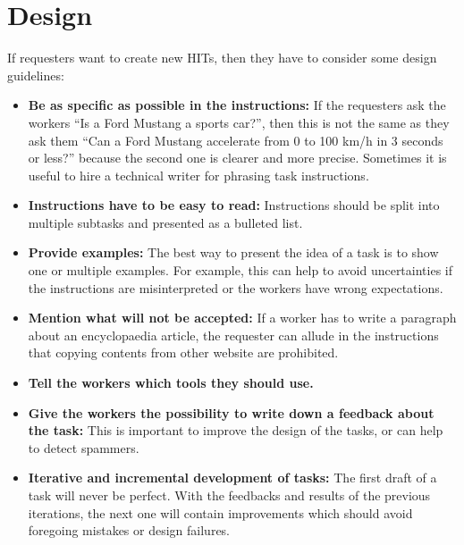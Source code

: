 \section{Design}
If requesters want to create new HITs, then they have to consider some design guidelines\cite{crowdsourcing_tutorial,mturk_bestpractices}: 
\begin{itemize}
\item \textbf{Be as specific as possible in the instructions:} If the requesters ask the workers ``Is a Ford Mustang a sports car?'', then this is not the same as they ask them ``Can a Ford Mustang accelerate from 0 to 100 km/h in 3 seconds or less?'' because the second one is clearer and more precise. Sometimes it is useful to hire a technical writer for phrasing task instructions. 
\item \textbf{Instructions have to be easy to read:} Instructions should be split into multiple subtasks and presented as a bulleted list. 
\item \textbf{Provide examples:} The best way to present the idea of a task is to show one or multiple examples. For example, this can help to avoid uncertainties if the instructions are misinterpreted or the workers have wrong expectations. 
\item \textbf{Mention what will not be accepted:} If a worker has to write a paragraph about an encyclopaedia article, the requester can allude in the instructions that copying contents from other website are prohibited.
\item \textbf{Tell the workers which tools they should use.} 
\item \textbf{Give the workers the possibility to write down a feedback about the task:} This is important to improve the design of the tasks, or can help to detect spammers. 
\item \textbf{Iterative and incremental development of tasks:} The first draft of a task will never be perfect. With the feedbacks and results of the previous iterations, the next one will contain improvements which should avoid foregoing mistakes or design failures.
\end{itemize}

